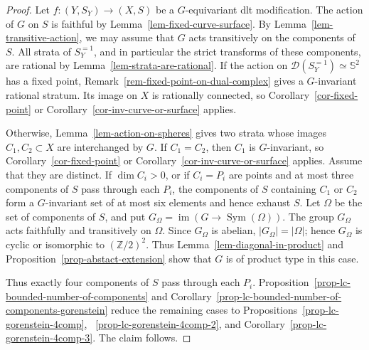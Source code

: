 \documentclass[11pt]{amsart}
\numberwithin{equation}{section}
\theoremstyle{definition}
\theoremstyle{remark}
\begin{document}
\begin{proof}
{
Let $f\colon(Y,S_Y)\to(X,S)$ be a $G$-equivariant dlt modification.
The action of $G$ on $S$ is faithful by
Lemma~\ref{lem-fixed-curve-surface}. By
Lemma~\ref{lem-transitive-action}, we may assume that $G$ acts
transitively on the components of $S$. All strata of $S_Y^{=1}$, and
in particular the strict transforms of these components, are rational
by Lemma~\ref{lem-strata-are-rational}. If the action on
$\mathcal D(S_Y^{=1})\simeq\mathbb S^2$ has a fixed point,
Remark~\ref{rem-fixed-point-on-dual-complex} gives a $G$-invariant
rational stratum. Its image on $X$ is rationally connected, so
Corollary~\ref{cor-fixed-point} or
Corollary~\ref{cor-inv-curve-or-surface} applies.

Otherwise, Lemma~\ref{lem-action-on-spheres} gives two strata whose
images $C_1,C_2\subset X$ are interchanged by $G$. If $C_1=C_2$, then
$C_1$ is $G$-invariant, so Corollary~\ref{cor-fixed-point} or
Corollary~\ref{cor-inv-curve-or-surface} applies. Assume that they are distinct. If
$\dim C_i>0$, or if $C_i=P_i$ are points and at most three components
of $S$ pass through each $P_i$, the components of $S$ containing $C_1$ or
$C_2$ form a $G$-invariant set of at most six elements and hence
exhaust $S$. Let $\Omega$ be the set of components of $S$, and put
$G_\Omega=\operatorname{im}(G\to\operatorname{Sym}(\Omega))$. The group $G_\Omega$ acts faithfully and transitively on
$\Omega$. Since $G_\Omega$ is abelian, $|G_\Omega|=|\Omega|$;
hence $G_\Omega$ is cyclic or isomorphic to $(\mathbb Z/2)^2$. Thus
Lemma~\ref{lem-diagonal-in-product} and
Proposition~\ref{prop-abstact-extension} show that $G$ is of product
type in this case.

Thus exactly four components of $S$ pass through each $P_i$.
Proposition~\ref{prop-lc-bounded-number-of-components} and
Corollary~\ref{prop-lc-bounded-number-of-components-gorenstein} reduce
the remaining cases to Propositions~\ref{prop-lc-gorenstein-4comp},
~\ref{prop-lc-gorenstein-4comp-2}, and
Corollary~\ref{prop-lc-gorenstein-4comp-3}. The claim follows.
}
\end{proof}
\end{document}
